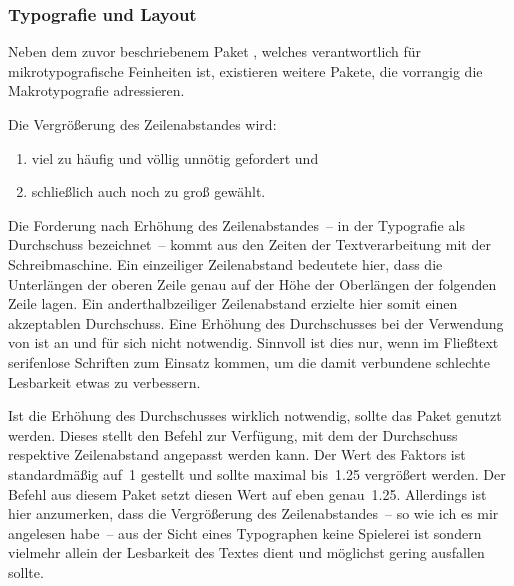 \subsubsection{%
  Typografie und Layout%
}
%
Neben dem zuvor beschriebenem Paket , welches verantwortlich 
für mikrotypografische Feinheiten ist, existieren weitere Pakete, die vorrangig 
die Makrotypografie adressieren.
%
\begin{DeclarePackages}
  Die Vergrößerung des Zeilenabstandes wird:
  \begin{enumerate}[itemindent=0pt,labelwidth=*,labelsep=1em,label=\Roman*.]
  \item viel zu häufig und völlig unnötig gefordert und
  \item schließlich auch noch zu groß gewählt.
  \end{enumerate}
  Die Forderung nach Erhöhung des Zeilenabstandes~-- in der Typografie als 
  Durchschuss bezeichnet~-- kommt aus den Zeiten der Textverarbeitung mit der 
  Schreibmaschine. Ein einzeiliger Zeilenabstand bedeutete hier, dass die 
  Unterlängen der oberen Zeile genau auf der Höhe der Oberlängen der folgenden 
  Zeile lagen. Ein anderthalbzeiliger Zeilenabstand erzielte hier somit einen 
  akzeptablen Durchschuss. Eine Erhöhung des Durchschusses bei der Verwendung 
  von  ist an und für sich nicht notwendig. Sinnvoll ist dies 
  nur, wenn im Fließtext serifenlose Schriften zum Einsatz kommen, um die damit 
  verbundene schlechte Lesbarkeit etwas zu verbessern.
  
  Ist die Erhöhung des Durchschusses wirklich notwendig, sollte das Paket 
   genutzt werden. Dieses stellt den Befehl 
   zur Verfügung, mit dem der Durchschuss 
  respektive Zeilenabstand angepasst werden kann. Der Wert des Faktors ist 
  standardmäßig auf~1 gestellt und sollte maximal bis~1.25 vergrößert werden. 
  Der Befehl  aus diesem Paket setzt diesen Wert auf 
  eben genau~1.25. Allerdings ist hier anzumerken, dass die Vergrößerung des 
  Zeilenabstandes~-- so wie ich es mir angelesen habe~-- aus der Sicht eines 
  Typographen keine Spielerei ist sondern vielmehr allein der Lesbarkeit des 
  Textes dient und möglichst gering ausfallen sollte.
  

\end{DeclarePackages}
